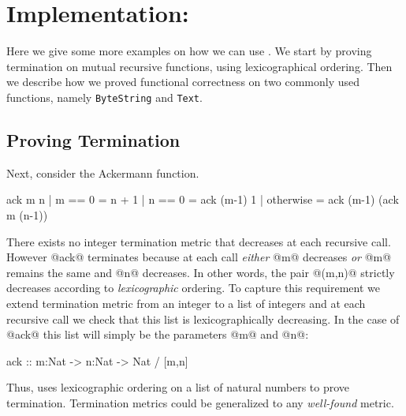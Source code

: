 \section{Implementation: \toolname}
Here we give some more examples on how we can use \toolname.
We start by proving termination on mutual recursive functions, 
using lexicographical ordering. 
%
Then we describe how we proved functional correctness on 
two commonly used functions, namely \texttt{ByteString}
and \texttt{Text}.

\subsection{Proving Termination}

   Next, consider the Ackermann function.
   \begin{code}
     ack m n 
       | m == 0    = n + 1
       | n == 0    = ack (m-1) 1 
       | otherwise = ack (m-1) (ack m (n-1))
   \end{code}
   There exists no integer termination metric that decreases at each recursive call.
   However @ack@ terminates because at each call \emph{either}
   @m@ decreases \emph{or} @m@ remains the same and @n@ decreases. 
   In other words, the pair @(m,n)@ strictly decreases according to
   \emph{lexicographic} ordering. 
   To capture this requirement we extend termination metric
   from an integer to a list of integers
   and at each recursive call we check that this list is
   lexicographically decreasing.
   In the case of
   @ack@ this list will simply be the parameters @m@
   and @n@:
   \begin{code}
     ack :: m:Nat -> n:Nat -> Nat / [m,n]
   \end{code}
   Thus, \toolname uses lexicographic ordering on 
   a list of natural numbers to prove termination.
   Termination metrics could be generalized to 
   any \emph{well-found} metric.
   
